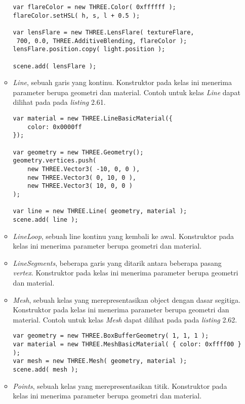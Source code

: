 \begin{itemize}
\begin{itemize}
\begin{lstlisting}[caption={Contoh penggunaan kelas {\it LensFlare}.},captionpos=b]
var flareColor = new THREE.Color( 0xffffff );
flareColor.setHSL( h, s, l + 0.5 );

var lensFlare = new THREE.LensFlare( textureFlare,
 700, 0.0, THREE.AdditiveBlending, flareColor );
lensFlare.position.copy( light.position );

scene.add( lensFlare );
\end{lstlisting}
	
	\item {\it Line}, sebuah garis yang kontinu. Konstruktor pada kelas ini menerima parameter berupa geometri dan material. Contoh untuk kelas {\it Line} dapat dilihat pada pada {\it listing} 2.61.
	
\begin{lstlisting}[caption={Contoh penggunaan kelas {\it Line}.},captionpos=b]
var material = new THREE.LineBasicMaterial({
	color: 0x0000ff
});

var geometry = new THREE.Geometry();
geometry.vertices.push(
	new THREE.Vector3( -10, 0, 0 ),
	new THREE.Vector3( 0, 10, 0 ),
	new THREE.Vector3( 10, 0, 0 )
);

var line = new THREE.Line( geometry, material );
scene.add( line );
\end{lstlisting}
	
	\item {\it LineLoop}, sebuah line kontinu yang kembali ke awal. Konstruktor pada kelas ini menerima parameter berupa geometri dan material.
	
	\item {\it LineSegments}, beberapa garis yang ditarik antara beberapa pasang {\it vertex}. Konstruktor pada kelas ini menerima parameter berupa geometri dan material.
	
	\item {\it Mesh}, sebuah kelas yang merepresentasikan object dengan dasar segitiga. Konstruktor pada kelas ini menerima parameter berupa geometri dan material. Contoh untuk kelas {\it Mesh} dapat dilihat pada pada {\it listing} 2.62.
	
\begin{lstlisting}[caption={Contoh penggunaan kelas {\it Mesh}.},captionpos=b]
var geometry = new THREE.BoxBufferGeometry( 1, 1, 1 );
var material = new THREE.MeshBasicMaterial( { color: 0xffff00 } );
var mesh = new THREE.Mesh( geometry, material );
scene.add( mesh );
\end{lstlisting}
	
	\item {\it Points}, sebuah kelas yang merepresentasikan titik. Konstruktor pada kelas ini menerima parameter berupa geometri dan material.
	

\end{itemize}
\end{itemize}
